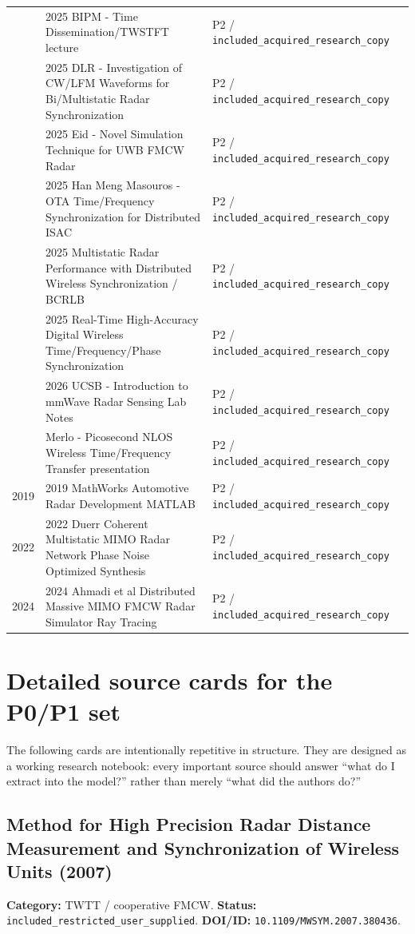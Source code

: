 \documentclass[11pt]{article}
\begin{document}
\begin{longtable}{@{}p{}p{}p{}p{}@{}}
 & 2025 BIPM - Time Dissemination/TWSTFT lecture & P2 / \nolinkurl{included_acquired_research_copy} &  \\
 & 2025 DLR - Investigation of CW/LFM Waveforms for Bi/Multistatic Radar Synchronization & P2 / \nolinkurl{included_acquired_research_copy} &  \\
 & 2025 Eid - Novel Simulation Technique for UWB FMCW Radar & P2 / \nolinkurl{included_acquired_research_copy} &  \\
 & 2025 Han Meng Masouros - OTA Time/Frequency Synchronization for Distributed ISAC & P2 / \nolinkurl{included_acquired_research_copy} &  \\
 & 2025 Multistatic Radar Performance with Distributed Wireless Synchronization / BCRLB & P2 / \nolinkurl{included_acquired_research_copy} &  \\
 & 2025 Real-Time High-Accuracy Digital Wireless Time/Frequency/Phase Synchronization & P2 / \nolinkurl{included_acquired_research_copy} &  \\
 & 2026 UCSB - Introduction to mmWave Radar Sensing Lab Notes & P2 / \nolinkurl{included_acquired_research_copy} &  \\
 & Merlo - Picosecond NLOS Wireless Time/Frequency Transfer presentation & P2 / \nolinkurl{included_acquired_research_copy} &  \\
2019 & 2019 MathWorks Automotive Radar Development MATLAB & P2 / \nolinkurl{included_acquired_research_copy} &  \\
2022 & 2022 Duerr Coherent Multistatic MIMO Radar Network Phase Noise Optimized Synthesis & P2 / \nolinkurl{included_acquired_research_copy} &  \\
2024 & 2024 Ahmadi et al Distributed Massive MIMO FMCW Radar Simulator Ray Tracing & P2 / \nolinkurl{included_acquired_research_copy} &  \\
\bottomrule
\end{longtable}
\normalsize

\clearpage
\section{Detailed source cards for the P0/P1 set}
The following cards are intentionally repetitive in structure. They are designed as a working research notebook: every important source should answer ``what do I extract into the model?'' rather than merely ``what did the authors do?''
\subsection*{Method for High Precision Radar Distance Measurement and Synchronization of Wireless Units (2007)}
\textbf{Category:} TWTT / cooperative FMCW. \textbf{Status:} \nolinkurl{included_restricted_user_supplied}. \textbf{DOI/ID:} \nolinkurl{10.1109/MWSYM.2007.380436}.
\end{document}
